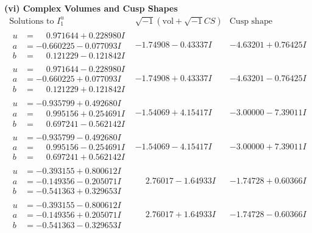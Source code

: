 \documentclass[1p]{elsarticle_modified}
\theoremstyle{definition}
\newcommand{\I}{\sqrt{-1}}
\begin{document}
\newpage\flushleft \textbf{(vi) Complex Volumes and Cusp Shapes}
$$\begin{array}{c|c|c}  
\text{Solutions to }I^u_{1}& \I (\text{vol} + \sqrt{-1}CS) & \text{Cusp shape}\\
 \hline 
\begin{aligned}
u &= \phantom{-}0.971644 + 0.228980 I \\
a &= -0.660225 - 0.077093 I \\
b &= \phantom{-}0.121229 - 0.121842 I\end{aligned}
 & -1.74908 - 0.43337 I & -4.63201 + 0.76425 I \\ \hline\begin{aligned}
u &= \phantom{-}0.971644 - 0.228980 I \\
a &= -0.660225 + 0.077093 I \\
b &= \phantom{-}0.121229 + 0.121842 I\end{aligned}
 & -1.74908 + 0.43337 I & -4.63201 - 0.76425 I \\ \hline\begin{aligned}
u &= -0.935799 + 0.492680 I \\
a &= \phantom{-}0.995156 + 0.254691 I \\
b &= \phantom{-}0.697241 - 0.562142 I\end{aligned}
 & -1.54069 + 4.15417 I & -3.00000 - 7.39011 I \\ \hline\begin{aligned}
u &= -0.935799 - 0.492680 I \\
a &= \phantom{-}0.995156 - 0.254691 I \\
b &= \phantom{-}0.697241 + 0.562142 I\end{aligned}
 & -1.54069 - 4.15417 I & -3.00000 + 7.39011 I \\ \hline\begin{aligned}
u &= -0.393155 + 0.800612 I \\
a &= -0.149356 - 0.205071 I \\
b &= -0.541363 + 0.329653 I\end{aligned}
 & \phantom{-}2.76017 - 1.64933 I & -1.74728 + 0.60366 I \\ \hline\begin{aligned}
u &= -0.393155 - 0.800612 I \\
a &= -0.149356 + 0.205071 I \\
b &= -0.541363 - 0.329653 I\end{aligned}
 & \phantom{-}2.76017 + 1.64933 I & -1.74728 - 0.60366 I \\ \hline\begin{aligned}

\end{aligned}
\end{array}$$
\end{document}
